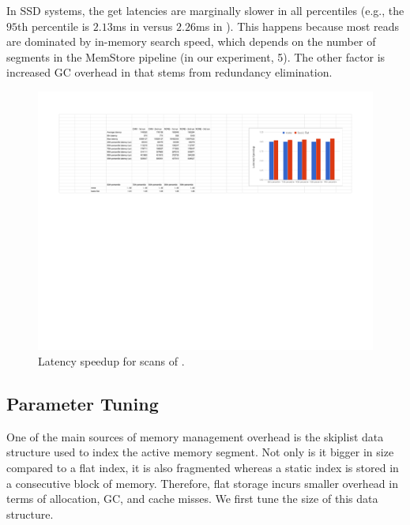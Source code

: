 In SSD systems, the get latencies are marginally slower in all percentiles (e.g., the 
$95$th percentile is $2.13$ms in \none\/ versus $2.26$ms in \adp). This happens
because most reads are dominated by in-memory search speed, which depends on the 
number of segments in the MemStore pipeline (in our experiment, 5). The other factor
is increased GC overhead in \adp\/ that stems from redundancy elimination. 


\begin{figure}[htb]
\includegraphics[width=\figw]{Figs/scans.pdf}
\caption{Latency speedup for scans of \basic.
}
\label{fig:scans}
\end{figure}



\subsection{Parameter Tuning} \label{ssec:tuning}
One of the main sources of memory management overhead is the skiplist data structure used to index the active  memory segment.
Not only  is it bigger in size compared to a flat index, it is also fragmented whereas a static index is stored in a consecutive block of memory. Therefore, flat storage incurs smaller overhead in terms of allocation, GC, and cache misses.
We first tune the size of this data structure.

